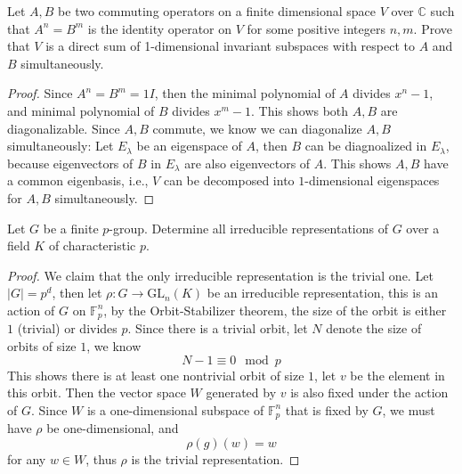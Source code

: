 \documentclass[openany]{book}
\newcommand{\F}{\mathbb{F}}
\begin{document}
\begin{prob}
    Let \(A,B\) be two commuting operators on a finite dimensional space \(V\) over \(\mathbb{C}\) such that \(A^{n}=B^{m}\) is the identity operator on \(V\) for some positive integers \(n,m\). Prove that \(V\) is a direct sum of 1-dimensional invariant subspaces with respect to \(A\) and \(B\) simultaneously.
\end{prob}
\begin{proof}
    Since $A^n=B^m=1I$, then the minimal polynomial of $A$ divides $x^n-1$, and minimal polynomial of $B$ divides $x^m-1$. This shows both $A,B$ are diagonalizable. Since $A,B$ commute, we know we can diagonalize $A,B$ simultaneously: Let $E_\lambda$ be an eigenspace of $A$, then $B$ can be diagnoalized in $E_\lambda$, because eigenvectors of $B$ in $E_\lambda$ are also eigenvectors of $A$. This shows $A,B$ have a common eigenbasis, i.e., $V$ can be decomposed into $1$-dimensional eigenspaces for $A,B$ simultaneously.
\end{proof}



\begin{prob}
    Let \(G\) be a finite \(p\)-group. Determine all irreducible representations of \(G\) over a field \(K\) of characteristic \(p\).
\end{prob}
\begin{proof}
    We claim that the only irreducible representation is the trivial one.  Let $|G|=p^d$, then let $\rho:G\to\text{GL}_n(K)$ be an irreducible representation, this is an action of $G$ on $\F_p^n$, by the Orbit-Stabilizer theorem, the size of the orbit is either $1$ (trivial) or divides $p$. Since there is a trivial orbit, let $N$ denote the size of orbits of size $1$, we know 
    \begin{equation*}
        N-1\equiv 0\mod p
    \end{equation*}
    This shows there is at least one nontrivial orbit of size $1$, let $v$ be the element in this orbit. Then the vector space $W$ generated by $v$ is also fixed under the action of $G$. Since $W$ is a one-dimensional subspace of $\F_p^n$ that is fixed by $G$, we must have $\rho$ be one-dimensional, and 
    \begin{equation*}
        \rho(g)(w)=w
    \end{equation*}
    for any $w\in W$, thus $\rho$ is the trivial representation.
\end{proof}
\end{document}

